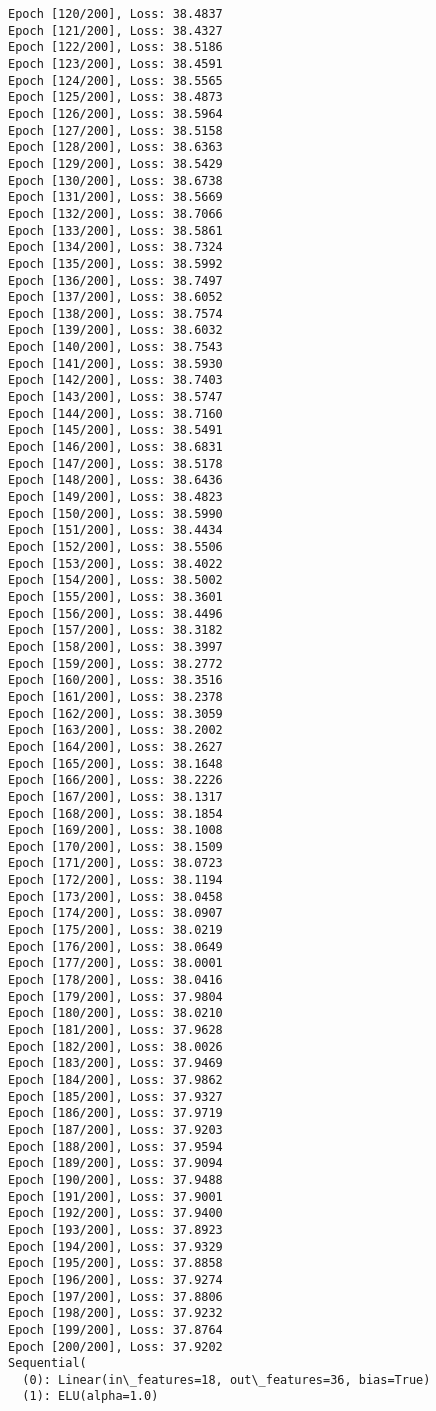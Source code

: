 \documentclass[11pt]{article}
\begin{document}
\begin{Verbatim}[commandchars=\\\{\}]
Epoch [120/200], Loss: 38.4837
Epoch [121/200], Loss: 38.4327
Epoch [122/200], Loss: 38.5186
Epoch [123/200], Loss: 38.4591
Epoch [124/200], Loss: 38.5565
Epoch [125/200], Loss: 38.4873
Epoch [126/200], Loss: 38.5964
Epoch [127/200], Loss: 38.5158
Epoch [128/200], Loss: 38.6363
Epoch [129/200], Loss: 38.5429
Epoch [130/200], Loss: 38.6738
Epoch [131/200], Loss: 38.5669
Epoch [132/200], Loss: 38.7066
Epoch [133/200], Loss: 38.5861
Epoch [134/200], Loss: 38.7324
Epoch [135/200], Loss: 38.5992
Epoch [136/200], Loss: 38.7497
Epoch [137/200], Loss: 38.6052
Epoch [138/200], Loss: 38.7574
Epoch [139/200], Loss: 38.6032
Epoch [140/200], Loss: 38.7543
Epoch [141/200], Loss: 38.5930
Epoch [142/200], Loss: 38.7403
Epoch [143/200], Loss: 38.5747
Epoch [144/200], Loss: 38.7160
Epoch [145/200], Loss: 38.5491
Epoch [146/200], Loss: 38.6831
Epoch [147/200], Loss: 38.5178
Epoch [148/200], Loss: 38.6436
Epoch [149/200], Loss: 38.4823
Epoch [150/200], Loss: 38.5990
Epoch [151/200], Loss: 38.4434
Epoch [152/200], Loss: 38.5506
Epoch [153/200], Loss: 38.4022
Epoch [154/200], Loss: 38.5002
Epoch [155/200], Loss: 38.3601
Epoch [156/200], Loss: 38.4496
Epoch [157/200], Loss: 38.3182
Epoch [158/200], Loss: 38.3997
Epoch [159/200], Loss: 38.2772
Epoch [160/200], Loss: 38.3516
Epoch [161/200], Loss: 38.2378
Epoch [162/200], Loss: 38.3059
Epoch [163/200], Loss: 38.2002
Epoch [164/200], Loss: 38.2627
Epoch [165/200], Loss: 38.1648
Epoch [166/200], Loss: 38.2226
Epoch [167/200], Loss: 38.1317
Epoch [168/200], Loss: 38.1854
Epoch [169/200], Loss: 38.1008
Epoch [170/200], Loss: 38.1509
Epoch [171/200], Loss: 38.0723
Epoch [172/200], Loss: 38.1194
Epoch [173/200], Loss: 38.0458
Epoch [174/200], Loss: 38.0907
Epoch [175/200], Loss: 38.0219
Epoch [176/200], Loss: 38.0649
Epoch [177/200], Loss: 38.0001
Epoch [178/200], Loss: 38.0416
Epoch [179/200], Loss: 37.9804
Epoch [180/200], Loss: 38.0210
Epoch [181/200], Loss: 37.9628
Epoch [182/200], Loss: 38.0026
Epoch [183/200], Loss: 37.9469
Epoch [184/200], Loss: 37.9862
Epoch [185/200], Loss: 37.9327
Epoch [186/200], Loss: 37.9719
Epoch [187/200], Loss: 37.9203
Epoch [188/200], Loss: 37.9594
Epoch [189/200], Loss: 37.9094
Epoch [190/200], Loss: 37.9488
Epoch [191/200], Loss: 37.9001
Epoch [192/200], Loss: 37.9400
Epoch [193/200], Loss: 37.8923
Epoch [194/200], Loss: 37.9329
Epoch [195/200], Loss: 37.8858
Epoch [196/200], Loss: 37.9274
Epoch [197/200], Loss: 37.8806
Epoch [198/200], Loss: 37.9232
Epoch [199/200], Loss: 37.8764
Epoch [200/200], Loss: 37.9202
Sequential(
  (0): Linear(in\_features=18, out\_features=36, bias=True)
  (1): ELU(alpha=1.0)

\end{Verbatim}
\end{document}
